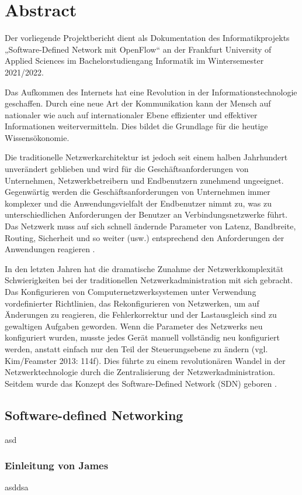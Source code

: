 \documentclass[fontsize=12pt,paper=a4,open=any,parskip=half,
  twoside=false,toc=listof,toc=bibliography,fleqn,leqno,
  captions=nooneline,captions=tableabove,british]{scrbook}
\begin{document}
\chapter{Abstract}
Der vorliegende Projektbericht dient als Dokumentation des Informatikprojekts „Software-Defined Network mit OpenFlow“ an der Frankfurt University of Applied Sciences im Bachelorstudiengang Informatik im Wintersemester 2021/2022.\par
Das Aufkommen des Internets hat eine Revolution in der Informationstechnologie geschaffen. Durch eine neue Art der Kommunikation kann der Mensch auf nationaler wie auch auf internationaler Ebene effizienter und effektiver Informationen weitervermitteln. Dies bildet die Grundlage für die heutige Wissensökonomie.\par
Die traditionelle Netzwerkarchitektur ist jedoch seit einem halben Jahrhundert unverändert geblieben und wird für die Geschäftsanforderungen von Unternehmen, Netzwerkbetreibern und Endbenutzern zunehmend ungeeignet. Gegenwärtig werden die Geschäftsanforderungen von Unternehmen immer komplexer und die Anwendungsvielfalt der Endbenutzer nimmt zu, was zu unterschiedlichen Anforderungen der Benutzer an Verbindungsnetzwerke führt. Das Netzwerk muss auf sich schnell ändernde Parameter von Latenz, Bandbreite, Routing, Sicherheit und so weiter (usw.) entsprechend den Anforderungen der Anwendungen reagieren \cite{case}.\par
In den letzten Jahren hat die dramatische Zunahme der Netzwerkkomplexität Schwierigkeiten bei der traditionellen Netzwerkadministration mit sich gebracht. Das Konfigurieren von Computernetzwerksystemen unter Verwendung vordefinierter Richtlinien, das Rekonfigurieren von Netzwerken, um auf Änderungen zu reagieren, die Fehlerkorrektur und der Lastausgleich sind zu gewaltigen Aufgaben geworden. Wenn die Parameter des Netzwerks neu konfiguriert wurden, musste jedes Gerät manuell vollständig neu konfiguriert werden, anstatt einfach nur den Teil der Steuerungsebene zu ändern (vgl. Kim/Feamster 2013: 114f). Dies führte zu einem revolutionären Wandel in der Netzwerktechnologie durch die Zentralisierung der Netzwerkadministration. Seitdem wurde das Konzept des Software-Defined Network (SDN) geboren \cite[114-115]{improve}. 


\section{Software-defined Networking}\label{sdn}
asd
\subsection{Einleitung von James}\label{einl-james}
asddsa
\end{document}
